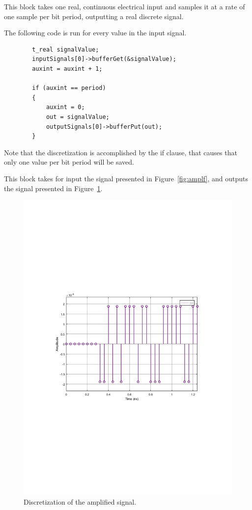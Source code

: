 \documentclass{article}
\begin{document}
This block takes one real, continuous electrical input and samples it at a rate of one sample per bit period, outputting a real discrete signal.
\par
The following code is run for every value in the input signal.

\begin{verbatim}
		t_real signalValue;
		inputSignals[0]->bufferGet(&signalValue);
		auxint = auxint + 1;

		if (auxint == period)
		{
			auxint = 0;
			out = signalValue;
			outputSignals[0]->bufferPut(out);
		}
\end{verbatim}
 
Note that the discretization is accomplished by the if clause, that causes that only one value per bit period will be saved.
\par
This block takes for input the signal presented in Figure~\ref{fig:amplf}, and outputs the signal presented in Figure~\ref{fig:discrt}.

\begin{figure}[H]
\centering
\includegraphics[width=\linewidth, trim= 0mm 100mm 0mm 100mm, clip]{discretized.pdf}
\caption{Discretization of the amplified signal.}
\label{fig:discrt}
\end{figure}
\end{document}
